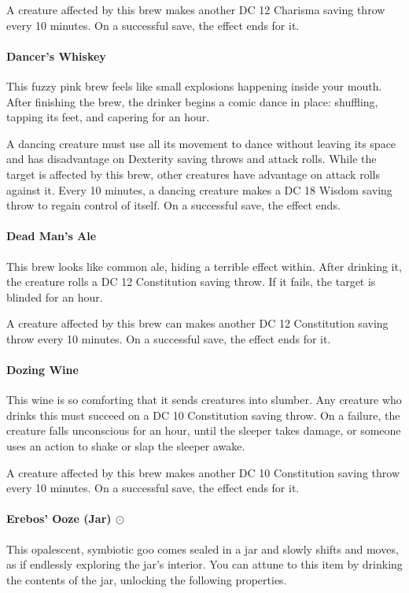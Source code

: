     A creature affected by this brew makes another DC 12 Charisma saving throw every 10 minutes.
    On a successful save, the effect ends for it.
\paragraph{Dancer's Whiskey} %
    This fuzzy pink brew feels like small explosions happening inside your mouth.
    After finishing the brew, the drinker begins a comic dance in place: shuffling, tapping its feet, and capering for an hour.

    A dancing creature must use all its movement to dance without leaving its space and has disadvantage on Dexterity saving throws and attack rolls.
    While the target is affected by this brew, other creatures have advantage on attack rolls against it.
    Every 10 minutes, a dancing creature makes a DC 18 Wisdom saving throw to regain control of itself.
    On a successful save, the effect ends.
\paragraph{Dead Man's Ale} %
    This brew looks like common ale, hiding a terrible effect within.
    After drinking it, the creature rolls a DC 12 Constitution saving throw.
    If it fails, the target is blinded for an hour.

    A creature affected by this brew can makes another DC 12 Constitution saving throw every 10 minutes.
    On a successful save, the effect ends for it.
\paragraph{Dozing Wine} %
    This wine is so comforting that it sends creatures into slumber.
    Any creature who drinks this must succeed on a DC 10 Constitution saving throw.
    On a failure, the creature falls unconscious for an hour, until the sleeper takes damage, or someone uses an action to shake or slap the sleeper awake.

    A creature affected by this brew makes another DC 10 Constitution saving throw every 10 minutes.
    On a successful save, the effect ends for it.
\paragraph{Erebos' Ooze (Jar) $\odot$} \label{item::erebosooze} %
    This opalescent, symbiotic goo comes sealed in a jar and slowly shifts and moves, as if endlessly exploring the jar's interior.
    You can attune to this item by drinking the contents of the jar, unlocking the following properties.

